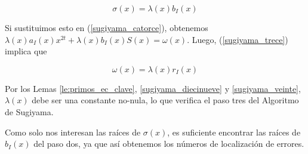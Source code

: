\begin{equation}
\label{sugiyama_diecinueve}
\sigma(x) = \lambda(x)b_I(x)
\end{equation}

Si sustituimos esto en (\ref{sugiyama_catorce}), obtenemos $\lambda(x)a_I(x)x^{2t} + \lambda(x)b_I(x)S(x) = \omega(x)$. Luego, (\ref{sugiyama_trece}) implica que

\begin{equation}
\label{sugiyama_veinte}
\omega(x) = \lambda(x)r_I(x)
\end{equation}

Por los Lemas \ref{le:primos_ec_clave}, \ref{sugiyama_diecinueve} y \ref{sugiyama_veinte}, $\lambda(x)$ debe ser una constante no-nula, lo que verifica el paso tres del Algoritmo de Sugiyama.

Como solo nos interesan las raíces de $\sigma(x)$, es suficiente encontrar las raíces de $b_I(x)$ del paso dos, ya que así obtenemos los números de localización de errores.

